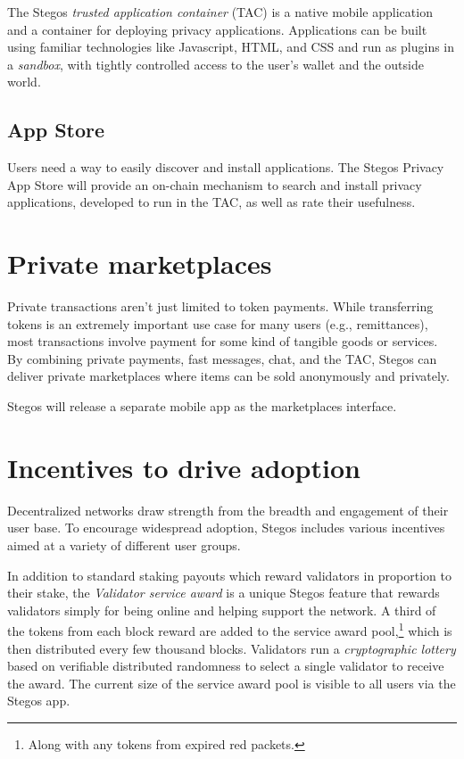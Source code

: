 \documentclass[8pt,fleqn,openany]{book}
\begin{document}
The Stegos \textit{trusted application container} (TAC) is a native mobile application and a container for deploying privacy applications. Applications can be built using familiar technologies like Javascript, HTML, and CSS and run as plugins in a \textit{sandbox}, with tightly controlled access to the user’s wallet and the outside world.

\subsection{App Store}
Users need a way to easily discover and install applications. The Stegos Privacy App Store will provide an on-chain mechanism to search and install privacy applications, developed to run in the TAC, as well as rate their usefulness.  

\section{Private marketplaces}
Private transactions aren’t just limited to token payments. While transferring tokens is an extremely important use case for many users (e.g., remittances), most transactions involve payment for some kind of tangible goods or services. By combining private payments, fast messages, chat, and the TAC, Stegos can deliver private marketplaces where items can be sold anonymously and privately. 

Stegos will release a separate mobile app as the marketplaces interface.  

\section{Incentives to drive adoption}
Decentralized networks draw strength from the breadth and engagement of their user base. To encourage widespread adoption, Stegos includes various incentives aimed at a variety of different user groups. 

In addition to standard staking payouts which reward validators in proportion to their stake, the \textit{Validator service award} is a unique Stegos feature that rewards validators simply for being online and helping support the network. A third of the tokens from each block reward are added to the service award pool,\footnote{Along with any tokens from expired red packets.} which is then distributed every few thousand blocks. Validators run a \textit{cryptographic lottery} based on verifiable distributed randomness to select a single validator to receive the award. The current size of the service award pool is visible to all users via the Stegos app.
\end{document}
